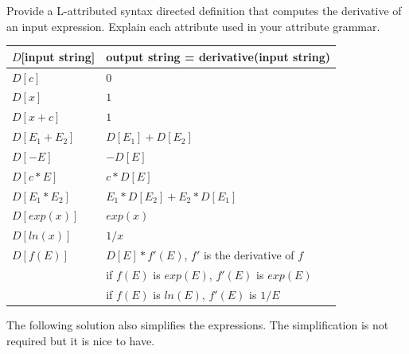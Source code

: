 \documentclass[12pt]{article}
\begin{document}
\begin{exe}
\begin{xlist}

{\ex Provide a L-attributed syntax directed definition that
computes the derivative of an input expression. Explain each
attribute used in your attribute grammar.
 
 \begin{center}
 \begin{tabular}{ll}
 \hline
 $D$[input string] & output string = derivative(input string) \\
 \hline
 $D[c]$ & $0$ \\
 $D[x]$ & $1$ \\
 $D[x+c]$ & $1$ \\
 $D[E_1 + E_2]$ & $D[E_1] + D[E_2]$ \\
 $D[-E]$ & $- D[E]$ \\
 $D[c*E]$ & $c * D[E]$ \\
 $D[E_1 * E_2]$ & $E_1 * D[E_2] + E_2 * D[E_1]$ \\
 $D[\textit{exp}(x)]$ & $\textit{exp}(x)$ \\
 $D[\textit{ln}(x)]$ & $1/x$ \\
 $D[f(E)]$ & $D[E] * f'(E)$, $f'$ is the derivative of $f$ \\
 & if $f(E)$ is $\textit{exp}(E)$, $f'(E)$ is $\textit{exp}(E)$ \\
 & if $f(E)$ is $\textit{ln}(E)$, $f'(E)$ is $\textit{1/E}$ \\
 \hline
 \end{tabular}
 \end{center}

\begin{soln}
The following solution also simplifies the expressions. The simplification is not required but it is nice to have.


\end{soln}}
\end{xlist}
\end{exe}
\end{document}
